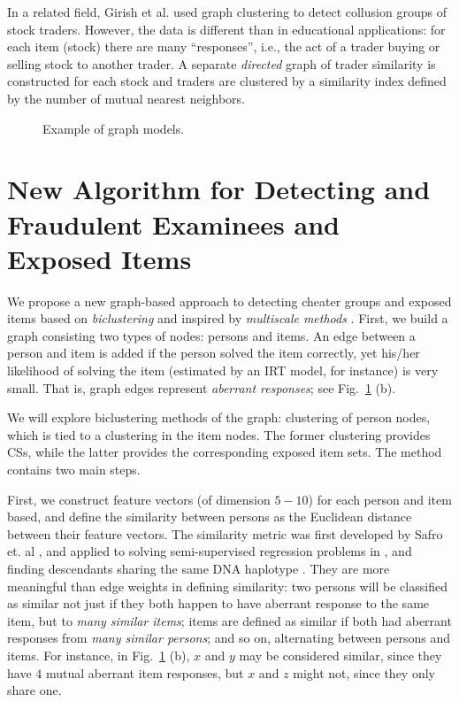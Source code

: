 \documentclass{article}
\begin{document}
In a related field, Girish et al. \cite{collusion_stock_graph_clustering} used graph clustering to detect collusion groups of stock traders. However, the data is different than in educational applications: for each item (stock) there are many ``responses'', i.e., the act of a trader buying or selling stock to another trader. A separate {\it directed} graph of trader similarity is constructed for each stock and traders are clustered by a similarity index defined by the number of mutual nearest neighbors.

\begin{figure}
    \centering
    \qquad
    \caption{Example of graph models.}
    \label{graph}
\end{figure}

\section{New Algorithm for Detecting  and Fraudulent Examinees and Exposed Items}
We propose a new graph-based approach to detecting cheater groups and exposed items based on {\it biclustering} and inspired by {\it multiscale methods} \cite{mg_guide}. First, we build a graph consisting two types of nodes: persons and items. An edge between a person and item is added if the person solved the item correctly, yet his/her likelihood of solving the item (estimated by an IRT model, for instance) is very small. That is, graph edges represent {\it aberrant responses}; see Fig.~\ref{graph} (b).

We will explore biclustering methods of the graph: clustering of person nodes, which is tied to a clustering in the item nodes. The former clustering provides CSs, while the latter provides the corresponding exposed item sets. The method contains two main steps. 

First, we construct feature vectors (of dimension $5-10$) for each person and item based, and define the similarity between persons as the Euclidean distance between their feature vectors. The similarity metric was first developed by Safro et. al \cite{safro}, and applied to solving semi-supervised regression problems in \cite{lamg} , and finding descendants sharing the same DNA haplotype \cite{primal}. They are more meaningful than edge weights in defining similarity: two persons will be classified as similar not just if they both happen to have aberrant response to the same item, but to {\it many similar items}; items are defined as similar if both had aberrant responses from {\it many similar persons}; and so on, alternating between persons and items. For instance, in Fig.~\ref{graph} (b), $x$ and $y$ may be considered similar, since they have $4$ mutual aberrant item responses, but $x$ and $z$ might not, since they only share one.
\end{document}
